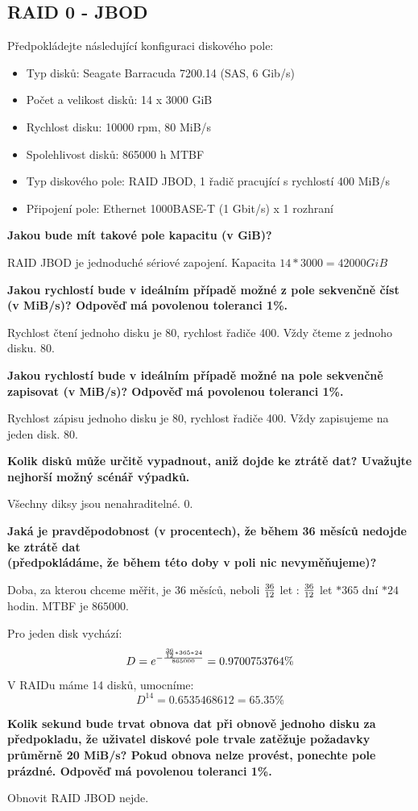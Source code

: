\subsection{RAID 0 - JBOD}
Předpokládejte následující konfiguraci diskového pole:

\begin{itemize}
    \item Typ disků: Seagate Barracuda 7200.14 (SAS, 6 Gib/s)
    \item Počet a velikost disků: 14 x 3000 GiB
    \item Rychlost disku: 10000 rpm, 80 MiB/s
    \item Spolehlivost disků: 865000 h MTBF
    \item Typ diskového pole: RAID JBOD, 1 řadič pracující s rychlostí 400 MiB/s
    \item Připojení pole: Ethernet 1000BASE-T (1 Gbit/s) x 1 rozhraní
\end{itemize}


\textbf{Jakou bude mít takové pole kapacitu (v GiB)?}

RAID JBOD je jednoduché sériové zapojení. Kapacita $14*3000 = 42000GiB$

\textbf{Jakou rychlostí bude v ideálním případě možné z pole sekvenčně číst (v MiB/s)? Odpověď má povolenou toleranci 1\%.}

Rychlost čtení jednoho disku je 80, rychlost řadiče 400. Vždy čteme z jednoho disku. 80.

\textbf{Jakou rychlostí bude v ideálním případě možné na pole sekvenčně zapisovat (v MiB/s)? Odpověď má povolenou toleranci 1\%.}

Rychlost zápisu jednoho disku je 80, rychlost řadiče 400. Vždy zapisujeme na jeden disk. 80.

\textbf{Kolik disků může určitě vypadnout, aniž dojde ke ztrátě dat? Uvažujte nejhorší možný scénář výpadků.}

Všechny diksy jsou nenahraditelné. 0.

\textbf{Jaká je pravděpodobnost (v procentech), že během 36 měsíců nedojde ke ztrátě dat \\(předpokládáme, že během této doby v poli nic nevyměňujeme)?}

Doba, za kterou chceme měřit, je $36$ měsíců, neboli ${36 \over 12}$ let : ${36 \over 12}$ let $* 365$ dní $* 24$ hodin. MTBF je $865 000$. 

Pro jeden disk vychází: 
$$D = e^{-{{36 \over 12}*365*24 \over 865000}} =  0.9700753764\%$$

V RAIDu máme 14 disků, umocníme:
$$D^{14} = 0.6535468612 = 65.35\%$$

\textbf{Kolik sekund bude trvat obnova dat při obnově jednoho disku za předpokladu, že uživatel diskové pole trvale zatěžuje požadavky průměrně 20 MiB/s? Pokud obnova nelze provést, ponechte pole prázdné. Odpověď má povolenou toleranci 1\%.}

Obnovit RAID JBOD nejde.